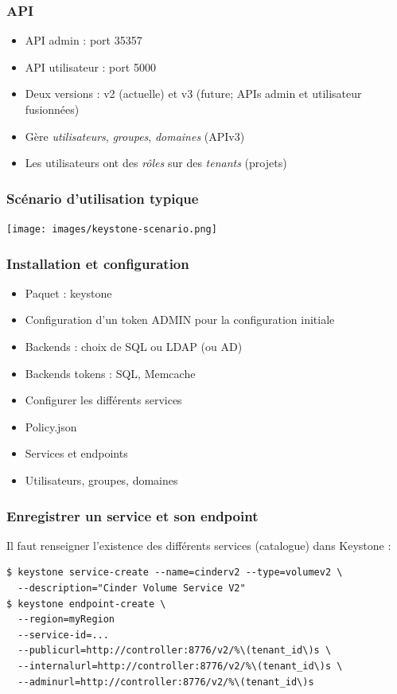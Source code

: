   \begin{frame}
    \frametitle{API}
    \begin{itemize}
      \item API admin : port 35357
      \item API utilisateur : port 5000
      \item Deux versions : v2 (actuelle) et v3 (future; APIs admin et utilisateur fusionnées)
      \item Gère \textit{utilisateurs}, \textit{groupes}, \textit{domaines} (APIv3)
      \item Les utilisateurs ont des \textit{rôles} sur des \textit{tenants} (projets)
    \end{itemize}
  \end{frame}

  \begin{frame}
    \frametitle{Scénario d'utilisation typique}
    \texttt{[image: images/keystone-scenario.png]}
  \end{frame}

  \begin{frame}
    \frametitle{Installation et configuration}
    \begin{itemize}
      \item Paquet : keystone
      \item Configuration d'un token ADMIN pour la configuration initiale
      \item Backends : choix de SQL ou LDAP (ou AD)
      \item Backends tokens : SQL, Memcache
      \item Configurer les différents services
      \item Policy.json
      \item Services et endpoints
      \item Utilisateurs, groupes, domaines
    \end{itemize}
  \end{frame}

  \begin{frame}[containsverbatim]
    \frametitle{Enregistrer un service et son endpoint}
    Il faut renseigner l'existence des différents services (catalogue) dans Keystone :
    \begin{verbatim}
$ keystone service-create --name=cinderv2 --type=volumev2 \
  --description="Cinder Volume Service V2"
$ keystone endpoint-create \
  --region=myRegion
  --service-id=...
  --publicurl=http://controller:8776/v2/%\(tenant_id\)s \
  --internalurl=http://controller:8776/v2/%\(tenant_id\)s \
  --adminurl=http://controller:8776/v2/%\(tenant_id\)s
    \end{verbatim}
  \end{frame}

